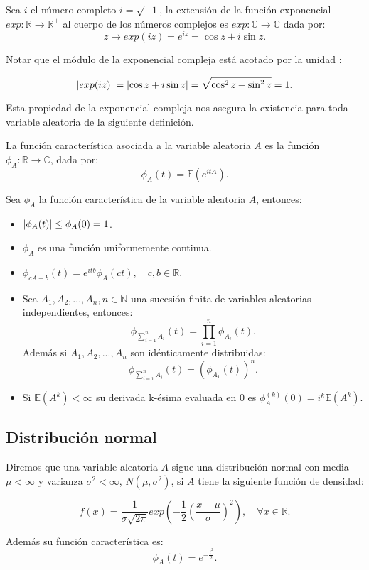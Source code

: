 \documentclass[../proyecto.tex]{memoir}
\begin{document}
\begin{defi}
Sea $i$ el número completo $i=\sqrt{-1}$, la extensión de la función exponencial $exp: \mathds{R} \to \mathds{R^{+}}$ al cuerpo de los números complejos es $exp: \mathds{C} \to \mathds{C}$ dada por:
$$
z \mapsto exp(iz) = e^{iz}=\cos z+i\sin z.
$$
\end{defi}

Notar que el módulo de la exponencial compleja está acotado por la unidad :

$$
\abs{ exp(iz) } = \abs{\cos z+i\sin z} = \sqrt{\cos^2 z + \sin^2 z} = 1.
$$

Esta propiedad de la exponencial compleja nos asegura la existencia para toda variable aleatoria de la siguiente definición.

\begin{defi}
La función característica asociada a la variable aleatoria $A$ es la función $\phi_{A}: \mathds{R} \to \mathds{C}$, dada por:
$$
\phi_{A}(t) = \mathds{E}(e^{itA}).
$$
\end{defi}

\begin{prop}
Sea $\phi_A$ la función característica de la variable aleatoria $A$, entonces:

\begin{itemize}
\item $\abs{\phi_A(t)} \leq \phi_A(0)=1$.
\item $\phi_A$ es una función uniformemente continua.
\item $\phi_{cA+b}(t)=e^{itb}\phi_A(ct), \quad c,b\in \mathds{R}$.
\item Sea $A_1, A_2,...,A_n, n\in\mathds{N}$ una sucesión finita de variables aleatorias independientes, entonces: $$ 
\phi_{\sum^{n}_{i=1} A_i} (t) = \prod_{i=1}^{n} \phi_{A_i} (t) .
$$ Además si $A_1, A_2,...,A_n$ son idénticamente distribuidas: $$
\phi_{\sum^{n}_{i=1} A_i} (t) = \left( \phi_{A_1}(t) \right)^{n}.
$$
\item Si $\mathds{E}(A^k) < \infty$ su derivada k-ésima evaluada en 0 es $\phi_A^{(k)}(0)=i^k\mathds{E}(A^k)$.
\end{itemize}

\end{prop}

\subsection{Distribución normal}

\begin{defi} \label{normal}
Diremos que una variable aleatoria $A$ sigue una distribución normal con media $\mu < \infty$ y varianza $\sigma^2 < \infty$, $N(\mu,\sigma^2)$, si $A$ tiene la siguiente función de densidad: 

$$
f(x) = \frac{1}{ \sigma \sqrt{ 2 \pi }} exp \left( -\frac{1}{2}\left( \frac{x-\mu}{\sigma} \right)^2 \right),\quad \forall x \in \mathds{R}.
$$

Además su función característica es: $$
 \phi_{A}(t)=e^{-\frac{t^2}{2}}.
$$
\end{defi}
\end{document}

